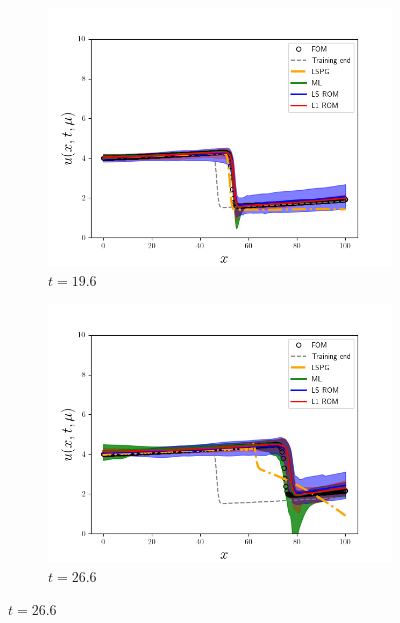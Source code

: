 \documentclass[3p,computermodern,10pt]{elsarticle}
\begin{document}
\begin{figure}
\begin{center}
\begin{subfigure}[t]{0.24\textwidth}
\includegraphics[trim={0cm 0cm 0cm 0cm},clip,width=1.0\linewidth]{code/burgers/synapse_models/basis_study/results/figures/uquartiles_mu1_0_mu2_0_t_0280.png} 
\caption{$t=19.6$}
\end{subfigure}
\begin{subfigure}[t]{0.24\textwidth}
\includegraphics[trim={0cm 0cm 0cm 0cm},clip,width=1.0\linewidth]{code/burgers/synapse_models/basis_study/results/figures/uquartiles_mu1_0_mu2_0_t_0380.png} 
\caption{$t=26.6$}
\end{subfigure}


\end{center}
\end{figure}
\end{document}
